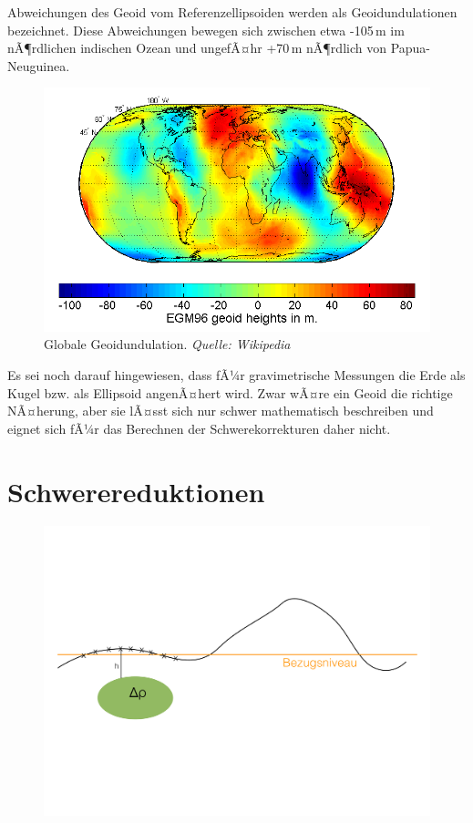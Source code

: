 Abweichungen des Geoid vom Referenzellipsoiden werden als Geoidundulationen bezeichnet. Diese Abweichungen bewegen sich zwischen etwa -105\,m im nÃ¶rdlichen indischen Ozean und ungefÃ¤hr +70\,m nÃ¶rdlich von Papua-Neuguinea. 

\begin{figure}[H]
  \includegraphics[width = \textwidth]{GravimetrieBilder/Geoidundulation}
  \caption*{Globale Geoidundulation. \textit{Quelle: Wikipedia}}
\end{figure}

Es sei noch darauf hingewiesen, dass fÃ¼r gravimetrische Messungen die Erde als Kugel bzw. als Ellipsoid angenÃ¤hert wird. Zwar wÃ¤re ein Geoid die richtige NÃ¤herung, aber sie lÃ¤sst sich nur schwer mathematisch beschreiben und eignet sich fÃ¼r das Berechnen der Schwerekorrekturen daher nicht. 


\section{Schwerereduktionen}

\begin{figure}[H]
	\centering
	\includegraphics[width = \textwidth]{GravimetrieBilder/Schwerereduktionen}
\end{figure}

